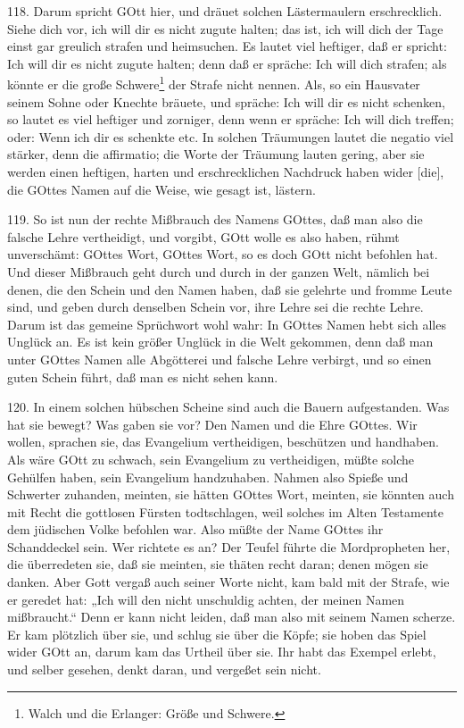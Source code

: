 118. Darum spricht GOtt hier, und dräuet solchen Lästermaulern erschrecklich. Siehe dich vor, ich will dir es nicht zugute halten; das ist,
ich will dich der Tage einst gar greulich strafen und heimsuchen. Es lautet viel heftiger, daß er spricht: Ich will dir es nicht zugute halten; denn daß er spräche: Ich will dich strafen; als könnte er die große Schwere\footnote{Walch und die Erlanger: Größe und Schwere.} der Strafe nicht nennen. Als, so ein Hausvater seinem Sohne oder Knechte bräuete, und spräche: Ich will dir es nicht schenken, so lautet es viel heftiger und zorniger, denn wenn er spräche: Ich will dich treffen; oder: Wenn ich dir es schenkte etc. In solchen Träumungen lautet die negatio viel stärker, denn die affirmatio; die Worte der Träumung lauten gering, aber sie werden einen heftigen, harten und erschrecklichen Nachdruck haben wider [die], die GOttes Namen auf die Weise, wie gesagt ist, lästern.

119. So ist nun der rechte Mißbrauch des Namens GOttes, daß man also die falsche Lehre vertheidigt, und vorgibt, GOtt wolle es also haben, rühmt unverschämt: GOttes Wort, GOttes Wort, so es doch GOtt nicht befohlen hat. Und dieser Mißbrauch geht durch und durch in der ganzen Welt, nämlich bei denen, die den Schein und den Namen haben, daß sie gelehrte und fromme Leute sind, und geben durch denselben Schein vor, ihre Lehre sei die rechte Lehre. Darum ist das gemeine Sprüchwort wohl wahr: In GOttes Namen hebt sich alles Unglück an. Es ist kein größer Unglück in die Welt gekommen, denn daß man unter GOttes Namen alle Abgötterei und falsche Lehre verbirgt, und so einen guten Schein führt, daß man es nicht sehen kann.

120. In einem solchen hübschen Scheine sind auch die Bauern aufgestanden. Was hat sie bewegt? Was gaben sie vor? Den Namen und die Ehre GOttes. Wir wollen, sprachen sie, das Evangelium vertheidigen, beschützen und handhaben. Als wäre GOtt zu schwach, sein Evangelium zu vertheidigen, müßte solche Gehülfen haben, sein Evangelium handzuhaben. Nahmen also Spieße und Schwerter zuhanden, meinten, sie hätten GOttes Wort, meinten, sie könnten auch mit Recht die gottlosen Fürsten todtschlagen, weil solches im Alten Testamente dem jüdischen Volke befohlen war. Also müßte der Name GOttes ihr Schanddeckel sein. Wer richtete es an? Der Teufel führte die Mordpropheten her, die überredeten sie, daß sie meinten, sie thäten recht daran; denen mögen sie danken. Aber Gott vergaß auch seiner Worte nicht, kam bald mit der Strafe, wie er geredet hat: „Ich will den nicht unschuldig achten, der meinen Namen mißbraucht.“ Denn er kann nicht leiden, daß man also mit seinem Namen scherze. Er kam plötzlich über sie, und schlug sie über die Köpfe; sie hoben das Spiel wider GOtt an, darum kam das Urtheil über sie. Ihr habt das Exempel erlebt, und selber gesehen, denkt daran, und vergeßet sein nicht.

